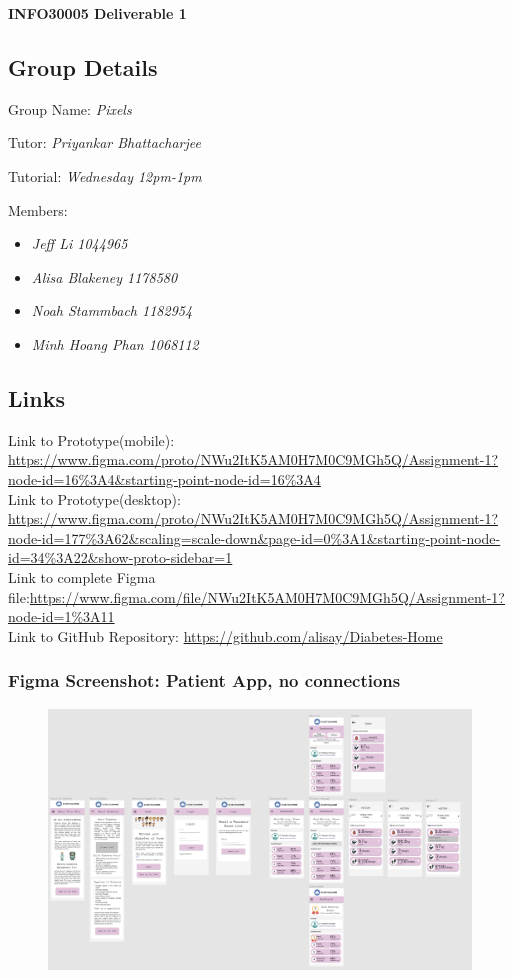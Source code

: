 \documentclass[12pt]{article}
\begin{document}
\begin{center}
\Huge\bf INFO30005 Deliverable 1
\end{center}

\subsection*{Group Details}
Group Name: \textit{Pixels}\par
Tutor: \textit{Priyankar Bhattacharjee}\par
Tutorial: \textit{Wednesday 12pm-1pm}\par
Members: \vspace{-2ex}
\begin{itemize}[noitemsep]
	\item \textit{Jeff Li 1044965}
	\item \textit{Alisa Blakeney 1178580}
	\item \textit{Noah Stammbach 1182954}
	\item \textit{Minh Hoang Phan 1068112}
\end{itemize}
\subsection*{Links}
Link to Prototype(mobile): {\small\url{https://www.figma.com/proto/NWu2ItK5AM0H7M0C9MGh5Q/Assignment-1?node-id=16%3A4&starting-point-node-id=16%3A4}}\\
Link to Prototype(desktop): {\small\url{https://www.figma.com/proto/NWu2ItK5AM0H7M0C9MGh5Q/Assignment-1?node-id=177%3A62&scaling=scale-down&page-id=0%3A1&starting-point-node-id=34%3A22&show-proto-sidebar=1}}\\
Link to complete Figma file:{\small\url{https://www.figma.com/file/NWu2ItK5AM0H7M0C9MGh5Q/Assignment-1?node-id=1\%3A11}}\\
Link to GitHub Repository: {\small\url{https://github.com/alisay/Diabetes-Home}}
\newpage
\subsubsection*{Figma Screenshot: Patient App, no connections}
\begin{figure}[H]
	\centering
	\includegraphics[width=.8\textwidth]{patient_nolines}
\end{figure}
\end{document}
